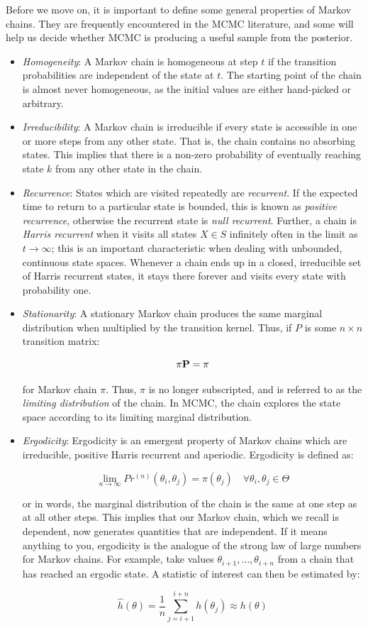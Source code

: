 Before we move on, it is important to define some general properties of Markov chains. They are frequently encountered in the MCMC literature, and some will help us decide whether MCMC is producing a useful sample from the posterior.

\begin{itemize}
\item \emph{Homogeneity}: A Markov chain is homogeneous at step $t$ if the transition probabilities are independent of the state at $t$. The starting point of the chain is almost never homogeneous, as the initial values are either hand-picked or arbitrary.
\item \emph{Irreducibility}: A Markov chain is irreducible if every state is accessible in one or more steps from any other state. That is, the chain contains no absorbing states. This implies that there is a non-zero probability of eventually reaching state $k$ from any other state in the chain.
\item \emph{Recurrence}: States which are visited repeatedly are \emph{recurrent}. If the expected time to return to a particular state is bounded, this is known as \emph{positive recurrence}, otherwise the recurrent state is \emph{null recurrent}. Further, a chain is \emph{Harris recurrent} when it visits all states $X \in S$ infinitely often in the limit as $t \to \infty$; this is an important characteristic when dealing with unbounded, continuous state spaces. Whenever a chain ends up in a closed, irreducible set of Harris recurrent states, it stays there forever and visits every state with probability one.
\item \emph{Stationarity}: A stationary Markov chain produces the same marginal distribution when multiplied by the transition kernel.  Thus, if $P$ is some $n \times n$ transition matrix:

\[{\bf \pi P} = {\bf \pi}\]

\noindent for Markov chain $\pi$. Thus, $\pi$ is no longer subscripted, and is referred to as the \emph{limiting distribution} of the chain. In MCMC, the chain explores the state space according to its limiting marginal distribution.
\item \emph{Ergodicity}: Ergodicity is an emergent property of Markov chains which are irreducible, positive Harris recurrent and aperiodic. Ergodicity is defined as:

\[
\lim_{n \to \infty} Pr^{(n)}(\theta_i,\theta_j) = \pi(\theta_j) \quad \forall \theta_i, \theta_j \in \Theta
\]

\noindent or in words, the marginal distribution of the chain is the same at one step as at all other steps. This implies that our Markov chain, which we recall is dependent, now generates quantities that are independent. If it means anything to you, ergodicity is the analogue of the strong law of large numbers for Markov chains. For example, take values $\theta_{i+1},\ldots,\theta_{i+n}$ from a chain that has reached an ergodic state. A statistic of interest can then be estimated by:

\[
\hat{h}(\theta) = \frac{1}{n}\sum_{j=i+1}^{i+n} h(\theta_j) \approx h(\theta)
\]

\end{itemize}

